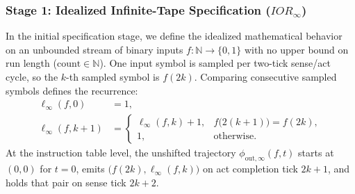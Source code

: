 \subsubsection{Stage 1: Idealized Infinite-Tape Specification (\texorpdfstring{$IOR_\infty$}{IOR\_inf})}
\label{sec:case-machine-reference}
In the initial specification stage, we define the idealized mathematical behavior on an unbounded stream of binary inputs $f:\mathbb{N}\to\{0,1\}$ with no upper bound on run length ($\mathrm{count}\in\mathbb{N}$). One input symbol is sampled per two-tick sense/act cycle, so the $k$-th sampled symbol is $f(2k)$. Comparing consecutive sampled symbols defines the recurrence:
\begin{equation}
\begin{aligned}
  \ell_\infty(f,0) &= 1, \\
  \ell_\infty(f,k{+}1) &=
  \begin{cases}
    \ell_\infty(f,k)+1, & f\bigl(2(k{+}1)\bigr)=f(2k),\\
    1, & \text{otherwise.}
  \end{cases}
\end{aligned}
  \label{eq:rle-inf-recurrence}
\end{equation}
At the instruction table level, the unshifted trajectory $\phi_{\mathrm{out},\infty}(f,t)$ starts at $(0,0)$ for $t=0$, emits $\bigl(f(2k),\ell_\infty(f,k)\bigr)$ on act completion tick $2k+1$, and holds that pair on sense tick $2k+2$.

